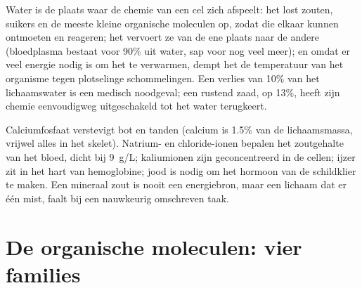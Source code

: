 \begin{proposition}\label{prop:g10:chemistry-of-life:water-roles}
Water is de plaats waar de chemie van een cel zich afspeelt: het lost
zouten, suikers en de meeste kleine organische moleculen op, zodat die
elkaar kunnen ontmoeten en reageren; het vervoert ze van de ene plaats
naar de andere (bloedplasma bestaat voor 90\% uit water, sap voor nog
veel meer); en omdat er veel energie nodig is om het te verwarmen,
dempt het de temperatuur van het organisme tegen plotselinge
schommelingen. Een verlies van 10\% van het lichaamswater is een
medisch noodgeval; een rustend zaad, op 13\%, heeft zijn chemie
eenvoudigweg uitgeschakeld tot het water terugkeert.
\end{proposition}
\admitted

\begin{example}\label{ex:g10:chemistry-of-life:salts}
Calciumfosfaat verstevigt bot en tanden (calcium is 1.5\% van de
lichaamsmassa, vrijwel alles in het skelet). Natrium- en chloride-ionen
bepalen het zoutgehalte van het bloed, dicht bij \qty{9}{g/L};
kaliumionen zijn geconcentreerd in de cellen; ijzer zit in het hart van
hemoglobine; jood is nodig om het hormoon van de schildklier te maken.
Een mineraal zout is nooit een energiebron, maar een lichaam dat er één
mist, faalt bij een nauwkeurig omschreven taak.
\end{example}

\section{De organische moleculen: vier families}


